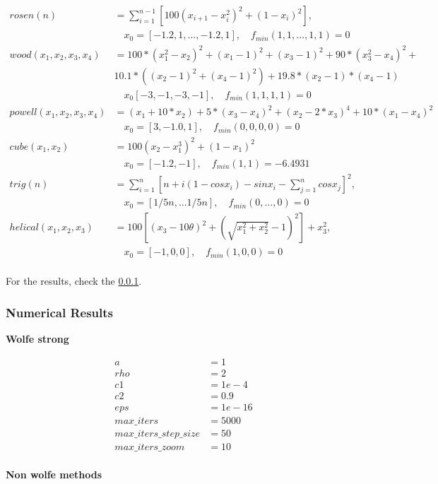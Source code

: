 \documentclass[a4paper,11pt]{article}
\numberwithin{equation}{section} %
\begin{document}
\begin{align*}
    rosen(n) &= \sum_{i=1}^{n-1} [100 (x_{i+1}-x_i^2)^2 + (1-x_i)^2], \\ &\quad x_0 = [-1.2,1,...,-1.2,1], \quad f_{min}(1,1,...,1,1)=0  \\
    wood(x_1,x_2,x_3,x_4) &= 100*(x_1^2-x_2)^2 + (x_1-1)^2 + (x_3-1)^2 + 90*(x_3^2 - x_4)^2 + \\ & 10.1*((x_2-1)^2 + (x_4-1)^2) + 19.8*(x_2-1)*(x_4-1)\\ & \quad x_0 [-3,-1,-3,-1], \quad f_{min}(1,1,1,1) = 0 \\
    powell(x_1,x_2,x_3,x_4) &= (x_1+10*x_2) + 5*(x_3-x_4)^2 + (x_2-2*x_3)^4 + 10*(x_1-x_4)^2 \\ & \quad x_0 = [3,-1.0,1], \quad f_{min}(0,0,0,0) = 0 \\
    cube(x_1,x_2) &= 100(x_2-x_1^3)^2 + (1-x_1)^2 \\ & \quad x_0 = [-1.2,-1], \quad f_{min}(1,1) = -6.4931 \\ 
    trig(n) &= \sum_{i=1}^{n}[n + i(1-cosx_i) - sinx_i - \sum_{j=1}^{n}cosx_j]^2,\\ & \quad x_0 = [1/5n,...1/5n], \quad f_{min}(0,...,0) = 0 \\
    helical(x_1,x_2,x_3) &= 100[(x_3-10\theta)^2 + (\sqrt{x_1^2+x_2^2}-1)^2] + x_3^2, \\ & \quad x_0 = [-1,0,0], \quad f_{min}(1,0,0) = 0 \\
\end{align*}

For the results, check the \ref{simulation2}.

\subsubsection{Numerical Results}
\label{simulation2}

\textbf{Wolfe strong}

\begin{align*}
a &= 1 \\
rho &= 2 \\
c1 &= 1e-4 \\
c2 &= 0.9 \\
eps &= 1e-16 \\ 
max\_iters &= 5000 \\ 
max\_iters\_step\_size &= 50 \\
max\_iters\_zoom &= 10 \\
\end{align*}

\textbf{Non wolfe methods}
\end{document}
